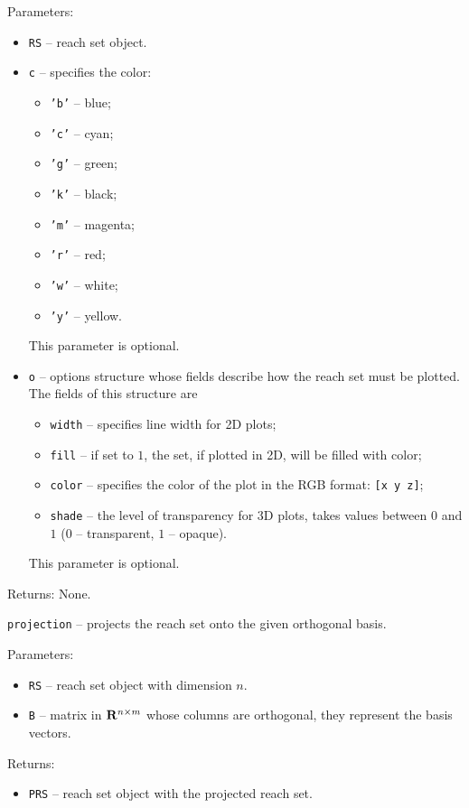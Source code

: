 Parameters:
\begin{itemize}
\item {\tt RS} -- reach set object.
\item {\tt c} -- specifies the color:
\begin{itemize}
\item {\tt 'b'} -- blue;
\item {\tt 'c'} -- cyan;
\item {\tt 'g'} -- green;
\item {\tt 'k'} -- black;
\item {\tt 'm'} -- magenta;
\item {\tt 'r'} -- red;
\item {\tt 'w'} -- white;
\item {\tt 'y'} -- yellow.
\end{itemize}
This parameter is optional.
\item {\tt o} -- options structure whose fields describe how the reach set
must be plotted. The fields of this structure are
\begin{itemize}
\item {\tt width} -- specifies line width for 2D plots;
\item {\tt fill} -- if set to $1$, the set, if plotted in 2D,
will be filled with color;
\item {\tt color} -- specifies the color of the plot in the RGB format:
{\tt [x y z]};
\item {\tt shade} -- the level of transparency for 3D plots, takes values
between $0$ and $1$ ($0$ -- transparent, $1$ -- opaque).
\end{itemize}
This parameter is optional.
\end{itemize}

Returns: None.

\newpage

{\Large {\tt projection}} -- projects the reach set onto the given orthogonal
basis.

Parameters:
\begin{itemize}
\item {\tt RS} -- reach set object with dimension $n$.
\item {\tt B} -- matrix in ${\bf R}^{n\times m}$ whose columns are orthogonal,
they represent the basis vectors.
\end{itemize}

Returns:
\begin{itemize}
\item {\tt PRS} -- reach set object with the projected reach set.
\end{itemize}

